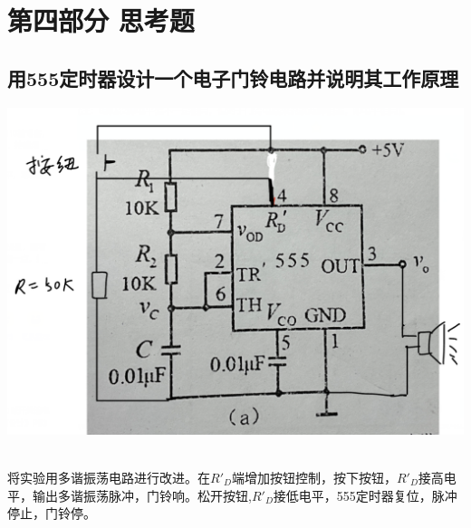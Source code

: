 \documentclass{ctexart}
\begin{document}
    


    \section*{第四部分 \quad 思考题}

\subsection*{用555定时器设计一个电子门铃电路并说明其工作原理}

    \begin{minipage}[c]{\textwidth}
            \centering
            \includegraphics[width=\linewidth]{思考题.png}
    \end{minipage}

~\\

    将实验用多谐振荡电路进行改进。在$R'_D$端增加按钮控制，按下按钮，$R'_D$接高电平，输出多谐振荡脉冲，门铃响。松开按钮,$R'_D$接低电平，555定时器复位，脉冲停止，门铃停。
    
\end{document}
